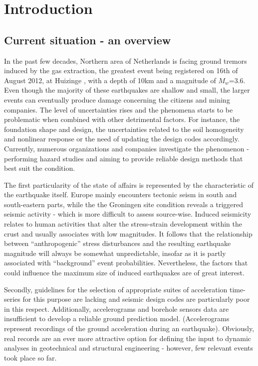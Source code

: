 \documentclass[12pt,a4paper]{report}
\begin{document}
\tableofcontents
	
\chapter{Introduction}
\section{Current situation - an overview}
In the past few decades, Northern area of Netherlands is facing ground tremors induced by the gas extraction, the greatest event being registered on 16th of August 2012, at Huizinge \cite{dost2013august}, with a depth of 10km and a magnitude of $M_w$=3.6. Even though the majority of these earthquakes are shallow and small, the larger events can eventually produce damage concerning the citizens and mining companies. The level of uncertainties rises and the phenomena starts to be problematic when combined with other detrimental factors. For instance, the foundation shape and design, the uncertainties related to the soil homogeneity and nonlinear response or the need of updating the design codes accordingly. Currently, numerous organizations and companies investigate the phenomenon - performing hazard studies and aiming to provide reliable design methods that best suit the condition. 

The first particularity of the state of affairs is represented by the characteristic of the earthquake itself. Europe mainly encounters tectonic seism in south and south-eastern parts, while the the Groningen site condition reveals a triggered seismic activity - which is more difficult to assess source-wise. Induced seismicity relates to human activities that alter the stress-strain development within the crust and usually associates with low magnitudes. It follows that the relationship between “anthropogenic” stress disturbances and the resulting earthquake magnitude will always be somewhat unpredictable, insofar as it is partly associated with “background” event probabilities. Nevertheless, the factors that could influence the maximum size of induced earthquakes are of great interest. 

Secondly, guidelines for the selection of appropriate suites of acceleration time-series for this purpose are lacking and seismic design codes are particularly poor in this respect. Additionally, accelerograms and borehole sensors data are insufficient to develop a reliable ground prediction model. (Accelerograms represent recordings of the ground acceleration during an earthquake). Obviously, real records are an ever more attractive option for defining the input to dynamic analyses in geotechnical and structural engineering - however, few relevant events took place so far. 
\end{document}
